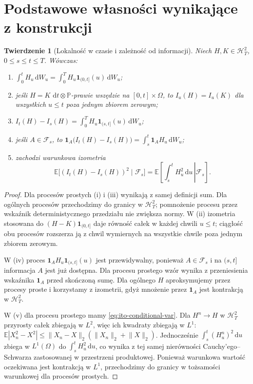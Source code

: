 \documentclass[11pt,a4paper,oneside]{report}
\numberwithin{equation}{chapter}
\theoremstyle{plain}
\newtheorem{twierdzenie}{Twierdzenie}[chapter]
\theoremstyle{definition}
\theoremstyle{remark}
\newcommand{\Prob}{\mathbb{P}}
\newcommand{\E}{\mathbb{E}}
\newcommand{\calF}{\mathcal{F}}
\newcommand{\calH}{\mathcal{H}}
\newcommand{\ind}[1]{\mathbf{1}_{#1}}
\newcommand{\dd}{\mathrm{d}}
\newcommand{\norm}[1]{\lVert #1\rVert}
\begin{document}
\section{Podstawowe własności wynikające z konstrukcji}\label{sec:volIII:02:04}
\begin{twierdzenie}[Lokalność w czasie i zależność od informacji]\label{thm:volIII:02:03}
\label{th:ito-properties}
Niech $H,K\in\calH_T^2$, $0\le s\le t\le T$.
Wówczas:
\begin{enumerate}[label=\textup{(\roman*)}]
\item $\displaystyle\int_0^tH_u\,\dd W_u
=\int_0^T H_u\ind{(0,t]}(u)\,\dd W_u$;
\item jeśli $H=K$ $\dd t\otimes\Prob$-prawie wszędzie
na $[0,t]\times\Omega$, to $I_u(H)=I_u(K)$ dla wszystkich
$u\le t$ poza jednym zbiorem zerowym;
\item $\displaystyle I_t(H)-I_s(H)=\int_0^TH_u\ind{(s,t]}(u)\,\dd W_u$;
\item jeśli $A\in\calF_s$, to
$\displaystyle\ind A\big(I_t(H)-I_s(H)\big)
=\int_s^t\ind A H_u\,\dd W_u$;
\item zachodzi warunkowa izometria
\[
\E\big[(I_t(H)-I_s(H))^2\mid\calF_s\big]
=\E\left[\left.\int_s^tH_u^2\,\dd u\,\right|\calF_s\right].
\]
\end{enumerate}
\end{twierdzenie}
\begin{proof}
Dla procesów prostych (i) i (iii) wynikają z samej
definicji sum. Dla ogólnych procesów przechodzimy
do granicy w $\calH_T^2$; pomnożenie procesu przez
wskaźnik deterministycznego przedziału nie zwiększa
normy. W (ii) izometria stosowana do $(H-K)\ind{(0,t]}$
daje równość całek w każdej chwili $u\le t$;
ciągłość obu procesów rozszerza ją z chwil wymiernych
na wszystkie chwile poza jednym zbiorem zerowym.

W (iv) proces $\ind A H_u\ind{(s,t]}(u)$ jest
przewidywalny, ponieważ $A\in\calF_s$ i na
$(s,t]$ informacja $A$ jest już dostępna. Dla procesu
prostego wzór wynika z przeniesienia wskaźnika $\ind A$
przed skończoną sumę. Dla ogólnego $H$ aproksymujemy
przez procesy proste i korzystamy z izometrii,
gdyż mnożenie przez $\ind A$ jest kontrakcją
w $\calH_T^2$.

W (v) dla procesu prostego mamy \eqref{eq:ito-conditional-var}.
Dla $H^n\to H$ w $\calH_T^2$ przyrosty całek
zbiegają w $L^2$, więc ich kwadraty zbiegają w $L^1$:
$\E|X_n^2-X^2|\le\norm{X_n-X}_2(\norm{X_n}_2+\norm X_2)$.
Jednocześnie $\int_s^t(H_u^n)^2\,\dd u$ zbiega
w $L^1(\Omega)$ do $\int_s^tH_u^2\,\dd u$,
co wynika z tej samej nierówności Cauchy'ego--Schwarza
zastosowanej w przestrzeni produktowej.
Ponieważ warunkowa wartość oczekiwana jest kontrakcją
w $L^1$, przechodzimy do granicy w tożsamości
warunkowej dla procesów prostych.
\end{proof}
\end{document}
